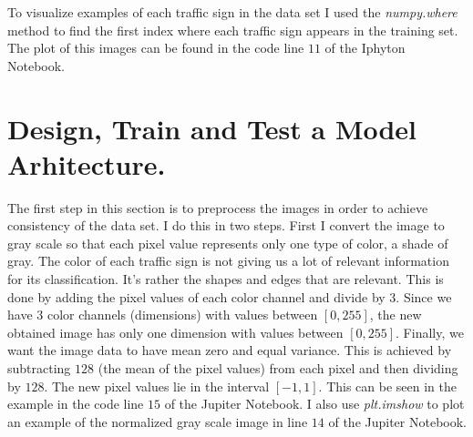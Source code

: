 \documentclass[11pt, a4paper]{amsart}
\begin{document}
To visualize examples of each traffic sign in the data set I used the \textit{numpy.where} method to find the first index where each traffic sign appears in the training set. The plot of this images can be found in the code line $11$ of the Iphyton Notebook. 

        \section{Design, Train and Test a Model Arhitecture.}
 
 The first step in this section is to preprocess the images in order to achieve consistency of the data set. I do this in two steps. First I convert the image to gray scale so that each pixel value represents only one type of color, a shade of gray. The color of each traffic sign is not giving us a lot of relevant information for its classification. It's rather the shapes and edges that are relevant. This is done by adding the pixel values of each color channel and divide by $3$. Since we have $3$ color channels (dimensions) with values between $[0, 255]$, the new obtained image has only one dimension with values between $[0,255]$. Finally, we want the image data to have mean zero and equal variance. This is achieved by subtracting $128$ (the mean of the pixel values) from each pixel and then dividing by $128$. The new pixel values lie in the interval $[-1,1]$. This can be seen in the example in the code line $15$ of the Jupiter Notebook. I also use \textit{plt.imshow} to plot an example of the normalized gray scale image in line $14$ of the Jupiter Notebook. 
 
\end{document}

